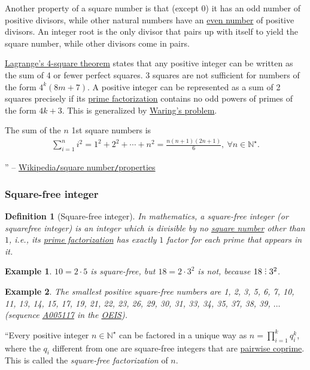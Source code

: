 \documentclass{article}
\newtheorem{definition}{Definition}
\newtheorem{example}{Example}
\DeclareRobustCommand{\divby}{%
	\mathrel{\vbox{\baselineskip.65ex\lineskiplimit0pt\hbox{.}\hbox{.}\hbox{.}}}%
}
\begin{document}
Another property of a square number is that (except 0) it has an odd number of positive divisors, while other natural numbers have an \href{https://en.wikipedia.org/wiki/Parity_(mathematics)}{even number} of positive divisors. An integer root is the only divisor that pairs up with itself to yield the square number, while other divisors come in pairs.

\href{https://en.wikipedia.org/wiki/Lagrange%27s_four-square_theorem}{Lagrange's 4-square theorem} states that any positive integer can be written as the sum of 4 or fewer perfect squares. 3 squares are not sufficient for numbers of the form $4^k(8m + 7)$. A positive integer can be represented as a sum of 2 squares precisely if its \href{https://en.wikipedia.org/wiki/Prime_factorization}{prime factorization} contains no odd powers of primes of the form $4k + 3$. This is generalized by \href{https://en.wikipedia.org/wiki/Waring%27s_problem}{Waring's problem}.


The sum of the $n$ 1st square numbers is
\begin{align*}
	\boxed{\sum_{i=1}^n i^2 = 1^2 + 2^2 + \cdots + n^2 = \frac{n(n + 1)(2n + 1)}{6},\ \forall n\in\mathbb{N}^\star.}
\end{align*}

'' -- \href{https://en.wikipedia.org/wiki/Square_number#Properties}{Wikipedia\texttt{/}square number\texttt{/}properties}

\subsubsection{Square-free integer}

\begin{definition}[Square-free integer]
	In mathematics, a \emph{square-free integer} (or \emph{squarefree integer}) is an integer which is divisible by no \href{https://en.wikipedia.org/wiki/Square_number}{square number} other than $1$, i.e., its \href{https://en.wikipedia.org/wiki/Prime_factorization}{prime factorization} has exactly $1$ factor for each prime that appears in it.
\end{definition}

\begin{example}
	$10 = 2\cdot5$ is square-free, but $18 = 2\cdot3^2$ is not, because $18\divby3^2$.
\end{example}

\begin{example}
	The smallest positive square-free numbers are \emph{1, 2, 3, 5, 6, 7, 10, 11, 13, 14, 15, 17, 19, 21, 22, 23, 26, 29, 30, 31, 33, 34, 35, 37, 38, 39}, $\ldots$ (sequence \href{https://oeis.org/A005117}{A005117} in the \href{https://en.wikipedia.org/wiki/On-Line_Encyclopedia_of_Integer_Sequences}{OEIS}).
\end{example}
``Every positive integer $n\in\mathbb{N}^\star$ can be factored in a unique way as $n = \prod_{i=1}^k q_i^k$, where the $q_i$ different from one are square-free integers that are \href{https://en.wikipedia.org/wiki/Pairwise_coprime}{pairwise coprime}. This is called the \textit{square-free factorization} of $n$.
\end{document}
